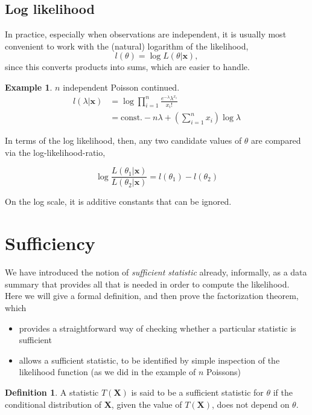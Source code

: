 \documentclass[
]{book}
\providecommand{\tightlist}{%
  \setlength{\itemsep}{0pt}\setlength{\parskip}{0pt}}
\newcommand{\bx}{{\boldsymbol x}}
\newcommand{\bX}{{\boldsymbol X}}
\newcommand{\const}{\text{const.}}
\theoremstyle{definition}
\newtheorem{definition}{Definition}[chapter]
\theoremstyle{definition}
\newtheorem{example}{Example}[chapter]
\theoremstyle{definition}
\theoremstyle{definition}
\theoremstyle{remark}
\begin{document}
\hypertarget{log-likelihood}{%
\subsection{Log likelihood}\label{log-likelihood}}

In practice, especially when observations are independent, it is usually most convenient to work with the (natural) logarithm of the likelihood,
\[
l(\theta) = \log L(\theta|\bx),
\]
since this converts products into sums, which are easier to
handle.

\begin{example}
\(n\) independent Poisson continued.
\begin{align*}
l(\lambda|\bx) 
&= \log \prod_{i=1}^n \frac{e^{-\lambda}\lambda^{x_i}}{x_i!} \\
&= \const -n\lambda + \left( \sum_{i=1}^n x_i \right)\log\lambda
\end{align*}
\end{example}

In terms of the log likelihood, then, any two candidate values of \(\theta\) are compared via the log-likelihood-ratio,

\[
 \log \frac{L(\theta_1|\bx)}{L(\theta_2|\bx)} = l(\theta_1) - l(\theta_2) 
\]

On the log scale, it is additive constants that can be ignored.

\hypertarget{sufficiency}{%
\section{Sufficiency}\label{sufficiency}}

We have introduced the notion of \emph{sufficient statistic} already, informally, as a data summary that provides all that is needed in order to compute the likelihood.
Here we will give a formal definition, and then prove the factorization theorem, which

\begin{itemize}
\tightlist
\item
  provides a straightforward way of checking whether a particular statistic is sufficient
\item
  allows a sufficient statistic, to be identified by simple inspection of the likelihood function (as we did in the example of \(n\) Poissons)
\end{itemize}

\begin{definition}
A statistic \(T(\bX)\) is said to be a sufficient statistic for \(\theta\) if the conditional distribution of \(\bX\), given the value of \(T(\bX)\), does not depend on \(\theta\).
\end{definition}
\end{document}
